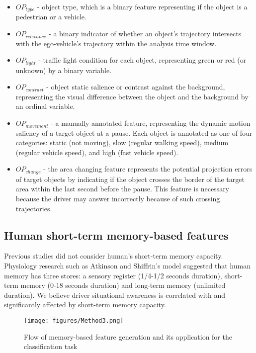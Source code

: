 \documentclass[letterpaper, 10 pt, conference]{ieeeconf}  %
\begin{document}
\begin{itemize}
    \item $OP_{type}$ - object type, which is a binary feature representing if the object is a pedestrian or a vehicle.
    \item $OP_{relevance}$ - a binary indicator of whether an object's trajectory intersects with the ego-vehicle's trajectory within the analysis time window.
    \item $OP_{light}$ - traffic light condition for each object, representing green or red (or unknown) by a binary variable.
    \item $OP_{contrast}$ - object static salience or contrast against the background, representing the visual difference between the object and the background by an ordinal variable.
    \item $OP_{movement}$ - a manually annotated feature, representing the dynamic motion saliency of a target object at a pause. Each object is annotated as one of four categories: static (not moving), slow (regular walking speed), medium (regular vehicle speed), and high (fast vehicle speed).
    \item $OP_{change}$ - the area changing feature represents the potential projection errors of target objects by indicating if the object crosses the border of the target area within the last second before the pause. This feature is necessary because the driver may answer incorrectly because of such crossing trajectories.
\end{itemize}

\subsection{Human short-term memory-based features}

Previous studies did not consider human's short-term memory capacity. Physiology research such as Atkinson and Shiffrin's model \cite{atkinson1968human} suggested that human memory has three stores: a sensory register (1/4-1/2 seconds duration), short-term memory (0-18 seconds duration) and long-term memory (unlimited duration). We believe driver situational awareness is correlated with and significantly affected by short-term memory capacity.

\begin{figure}[!t]
    \centering
    \texttt{[image: figures/Method3.png]}
    \caption{Flow of memory-based feature generation and its application for the classification task}
    \label{fig:propsed3}
\vspace{-3mm}
\end{figure}
\end{document}
